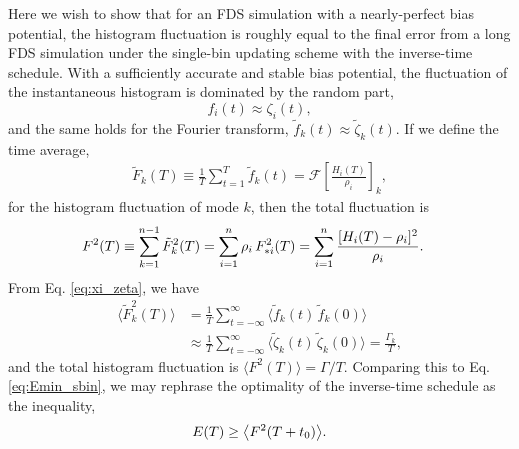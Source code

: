 \documentclass[preprint, superscriptaddress, floatfix]{revtex4-1}
\newcommand{\Err}{E}
\begin{document}
Here we wish to show that for an FDS simulation
with a nearly-perfect bias potential,
the histogram fluctuation
is roughly equal to the final error
from a long FDS simulation under the single-bin updating scheme
with the inverse-time schedule.
%
With a sufficiently accurate and stable bias potential,
the fluctuation of
the instantaneous histogram is dominated by the random part,
%
\begin{equation}
  f_i(t) \approx \zeta_i(t)
  ,
  \label{eq:xi_zeta}
\end{equation}
and the same holds for the Fourier transform,
$\tilde f_k(t) \approx \tilde \zeta_k(t).$
%
If we define the time average,
%
\begin{align*}
\tilde F_k(T) \equiv \frac 1 T \sum_{t = 1}^T \tilde f_k(t)
=\mathcal F\left[ \frac{ H_i(T) } { \rho_i } \right]_k
,
\end{align*}
%
for the histogram fluctuation of mode $k$,
then the total fluctuation is
%
\begin{align}
  F^2(T)
  &\equiv
  \sum_{k=1}^{n-1} \tilde F_k^2(T)
  =
  \sum_{i=1}^{n} \rho_i \, F_{*i}^2(T)
  =
  \sum_{i=1}^n
  \frac{ [ H_i(T) -\rho_i]^2 }{\rho_i}
  .
  \notag
\end{align}
%
From Eq. \eqref{eq:xi_zeta}, we have
%
\begin{align*}
\bigl\langle \tilde F_k^2(T) \bigr\rangle
&=
\frac{1}{T}
\sum_{t=-\infty}^\infty
\bigl\langle
  \tilde f_k(t) \, \tilde f_k(0)
\bigr\rangle
\\
&\approx
\frac{1}{T}
\sum_{t=-\infty}^\infty
\bigl\langle
  \tilde \zeta_k(t) \, \tilde \zeta_k(0)
\bigr\rangle
=
\frac{ \Gamma_k } { T }
,
\end{align*}
%
and the total histogram fluctuation is
$\bigl\langle F^2(T) \bigr\rangle = \Gamma/T$.
%
Comparing this to Eq. \eqref{eq:Emin_sbin},
we may rephrase the optimality of the inverse-time schedule
as the inequality,
\begin{equation}
  \Err(T)
  \ge
  \bigl\langle F^2(T+t_0) \bigr\rangle
  .
  \notag
\end{equation}
%
\end{document}
